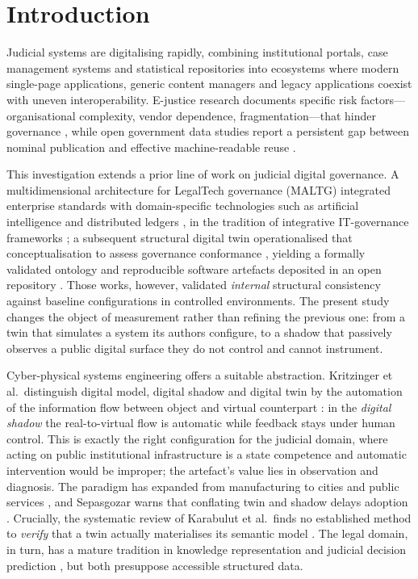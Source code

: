 \documentclass[engproc,proceedingpaper,submit,moreauthors]{Definitions/mdpi}
\begin{document}
\section{Introduction}
\label{sec:intro}
    Judicial systems are digitalising rapidly, combining institutional portals, case management systems and statistical repositories into ecosystems where modern single-page applications, generic content managers and legacy applications coexist with uneven interoperability. E-justice research documents specific risk factors---organisational complexity, vendor dependence, fragmentation---that hinder governance \cite{Rosa2013}, while open government data studies report a persistent gap between nominal publication and effective machine-readable reuse \cite{Janssen2012,Attard2015}.

    This investigation extends a prior line of work on judicial digital governance. A multidimensional architecture for LegalTech governance (MALTG) integrated enterprise standards with domain-specific technologies such as artificial intelligence and distributed ledgers \cite{paccha2026architecture}, in the tradition of integrative IT-governance frameworks \cite{DeHaes2013}; a subsequent structural digital twin operationalised that conceptualisation to assess governance conformance \cite{Paccha2026SDT}, yielding a formally validated ontology and reproducible software artefacts deposited in an open repository \cite{paccha2026zenodo}. Those works, however, validated \emph{internal} structural consistency against baseline configurations in controlled environments. The present study changes the object of measurement rather than refining the previous one: from a twin that simulates a system its authors configure, to a shadow that passively observes a public digital surface they do not control and cannot instrument.

    Cyber-physical systems engineering offers a suitable abstraction. Kritzinger et al.\ distinguish digital model, digital shadow and digital twin by the automation of the information flow between object and virtual counterpart \cite{Kritzinger2018}: in the \emph{digital shadow} the real-to-virtual flow is automatic while feedback stays under human control. This is exactly the right configuration for the judicial domain, where acting on public institutional infrastructure is a state competence and automatic intervention would be improper; the artefact's value lies in observation and diagnosis. The paradigm has expanded from manufacturing \cite{Tao2019} to cities and public services \cite{Shahat2021,Brauner2022}, and Sepasgozar warns that conflating twin and shadow delays adoption \cite{Sepasgozar2021}. Crucially, the systematic review of Karabulut et al.\ finds no established method to \emph{verify} that a twin actually materialises its semantic model \cite{Karabulut2024}. The legal domain, in turn, has a mature tradition in knowledge representation \cite{Casanovas2016} and judicial decision prediction \cite{Medvedeva2020}, but both presuppose accessible structured data.
\end{document}
